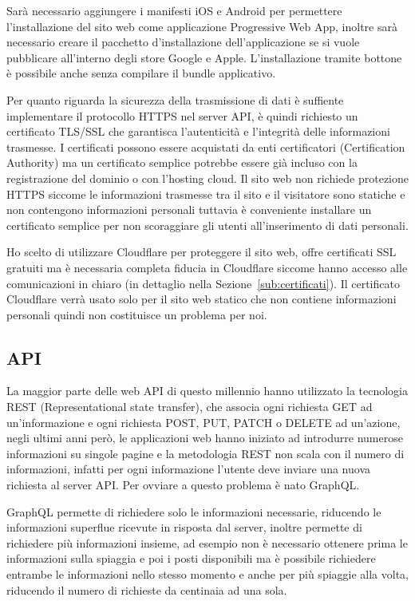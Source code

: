 Sar\`a necessario aggiungere i manifesti iOS e Android per permettere l'installazione del sito web come applicazione Progressive Web App, inoltre sar\`a necessario creare il pacchetto d'installazione dell'applicazione se si vuole pubblicare all'interno degli store Google e Apple. L'installazione tramite bottone \`e possibile anche senza compilare il bundle applicativo.

Per quanto riguarda la sicurezza della trasmissione di dati \`e suffiente implementare il protocollo HTTPS nel server API, \`e quindi richiesto un certificato TLS/SSL che garantisca l'autenticit\`a e l'integrit\`a delle informazioni trasmesse. I certificati possono essere acquistati da enti certificatori (Certification Authority) ma un certificato semplice potrebbe essere gi\`a incluso con la registrazione del dominio o con l'hosting cloud. Il sito web non richiede protezione HTTPS siccome le informazioni trasmesse tra il sito e il visitatore sono statiche e non contengono informazioni personali tuttavia \`e conveniente installare un certificato semplice per non scoraggiare gli utenti all'inserimento di dati personali.

Ho scelto di utilizzare Cloudflare per proteggere il sito web, offre certificati SSL gratuiti ma \`e necessaria completa fiducia in Cloudflare siccome hanno accesso alle comunicazioni in chiaro (in dettaglio nella Sezione~\ref{sub:certificati}). Il certificato Cloudflare verr\`a usato solo per il sito web statico che non contiene informazioni personali quindi non costituisce un problema per noi.

\subsection{API}%
\label{sub:api}

La maggior parte delle web API di questo millennio hanno utilizzato la tecnologia REST (Representational state transfer), che associa ogni richiesta GET ad un'informazione e ogni richiesta POST, PUT, PATCH o DELETE ad un'azione, negli ultimi anni per\`o, le applicazioni web hanno iniziato ad introdurre numerose informazioni su singole pagine e la metodologia REST non scala con il numero di informazioni, infatti per ogni informazione l'utente deve inviare una nuova richiesta al server API\@. Per ovviare a questo problema \`e nato GraphQL\@.

GraphQL permette di richiedere solo le informazioni necessarie, riducendo le informazioni superflue ricevute in risposta dal server, inoltre permette di richiedere pi\`u informazioni insieme, ad esempio non \`e necessario ottenere prima le informazioni sulla spiaggia e poi i posti disponibili ma \`e possibile richiedere entrambe le informazioni nello stesso momento e anche per pi\`u spiaggie alla volta, riducendo il numero di richieste da centinaia ad una sola. %

